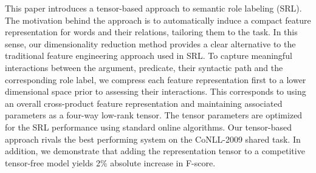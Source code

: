 This paper introduces a tensor-based approach to semantic role labeling (SRL). The motivation behind the approach is to automatically induce a compact feature representation for words and their relations, tailoring them to the task. In this sense, our dimensionality reduction method provides a clear alternative to the traditional feature engineering approach used in SRL. To capture meaningful interactions between the argument, predicate, their syntactic path and the corresponding role label, we compress each feature representation first to a lower dimensional space prior to assessing their interactions. This corresponds to using an overall cross-product feature representation and maintaining associated parameters as a four-way low-rank tensor. The tensor parameters are optimized for the SRL performance using standard online algorithms. Our tensor-based approach rivals the best performing system on the CoNLL-2009 shared task. In addition, we demonstrate that adding the representation tensor to a competitive tensor-free model yields 2\% absolute increase in F-score.
